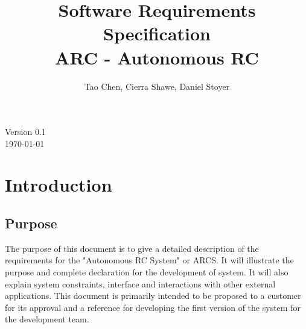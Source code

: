 \documentclass[draftclsnofoot,onecolumn,10pt]{IEEEtran}
\date{}
\begin{document}
\begin{titlepage}
	\title{Software Requirements Specification\\
	ARC - Autonomous RC}
	\author{Tao Chen, Cierra Shawe, Daniel Stoyer}
	\maketitle
	\begin{center}
	Version 0.1\\
	\vspace{1.9cm}
	\today
	\end{center}

	\thispagestyle{empty} %
	
\end{titlepage}

\tableofcontents

\newpage

\section{Introduction}

\subsection{Purpose} %
The purpose of this document is to give a detailed description of the requirements 
for the "Autonomous RC System" or ARCS. It will illustrate the purpose and 
complete declaration for the development of system. It will also explain system 
constraints, interface and interactions with other external applications. This document 
is primarily intended to be proposed to a customer for its approval and a reference for 
developing the first version of the system for the development team.
\end{document}
